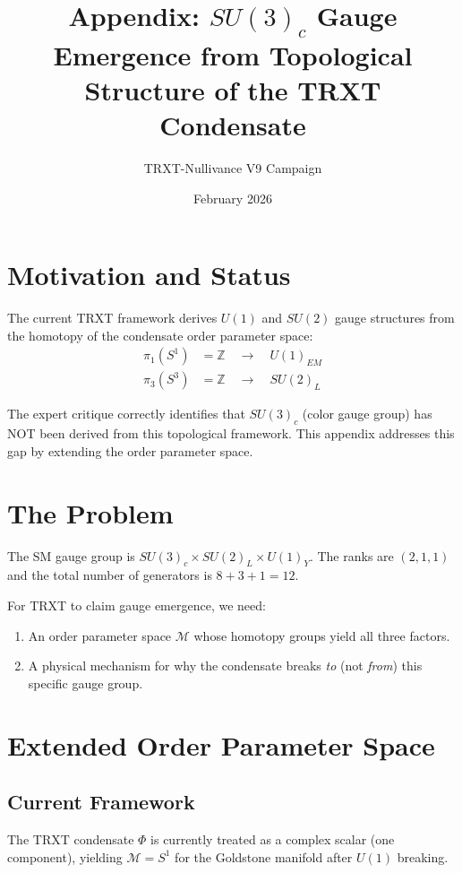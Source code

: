 \documentclass[12pt]{article}
\title{Appendix: $SU(3)_c$ Gauge Emergence from Topological Structure of the TRXT Condensate}
\author{TRXT-Nullivance V9 Campaign}
\date{February 2026}
\begin{document}
\maketitle

\section{Motivation and Status}

The current TRXT framework derives $U(1)$ and $SU(2)$ gauge structures from the homotopy of the condensate order parameter space:
\begin{align}
    \pi_1(S^1) &= \mathbb{Z} \quad \longrightarrow \quad U(1)_{EM} \\
    \pi_3(S^3) &= \mathbb{Z} \quad \longrightarrow \quad SU(2)_L
\end{align}

The expert critique correctly identifies that $SU(3)_c$ (color gauge group) has NOT been derived from this topological framework. This appendix addresses this gap by extending the order parameter space.

\section{The Problem}

The SM gauge group is $SU(3)_c \times SU(2)_L \times U(1)_Y$. The ranks are $(2, 1, 1)$ and the total number of generators is $8 + 3 + 1 = 12$. 

For TRXT to claim gauge emergence, we need:
\begin{enumerate}
    \item An order parameter space $\mathcal{M}$ whose homotopy groups yield all three factors.
    \item A physical mechanism for why the condensate breaks \textit{to} (not \textit{from}) this specific gauge group.
\end{enumerate}

\section{Extended Order Parameter Space}

\subsection{Current Framework}
The TRXT condensate $\Phi$ is currently treated as a complex scalar (one component), yielding $\mathcal{M} = S^1$ for the Goldstone manifold after $U(1)$ breaking.
\end{document}
